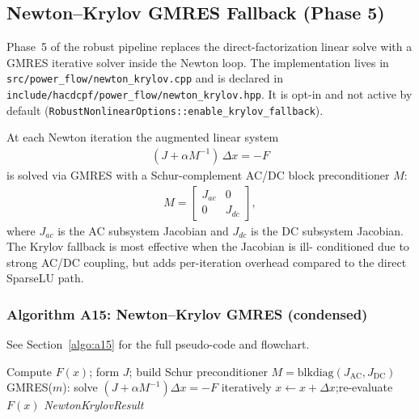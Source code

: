 \subsection{Newton--Krylov GMRES Fallback (Phase 5)}
\label{sec:newton-krylov}

Phase~5 of the robust pipeline replaces the direct-factorization linear solve
with a GMRES iterative solver inside the Newton loop.  The implementation lives
in \texttt{src/power\_flow/newton\_krylov.cpp} and is declared in
\texttt{include/hacdcpf/power\_flow/newton\_krylov.hpp}.  It is opt-in and not
active by default (\texttt{RobustNonlinearOptions::enable\_krylov\_fallback}).

At each Newton iteration the augmented linear system
\begin{align}
(J + \alpha M^{-1})\,\Delta x = -F
\end{align}
is solved via GMRES with a Schur-complement AC/DC block preconditioner $M$:
\begin{align}
M =
\begin{bmatrix}
J_{ac} & 0 \\
0 & J_{dc}
\end{bmatrix},
\end{align}
where $J_{ac}$ is the AC subsystem Jacobian and $J_{dc}$ is the DC subsystem
Jacobian.  The Krylov fallback is most effective when the Jacobian is ill-
conditioned due to strong AC/DC coupling, but adds per-iteration overhead
compared to the direct SparseLU path.

\subsubsection{Algorithm A15: Newton--Krylov GMRES (condensed)}
\label{algo:a15-inline}
See Section~\ref{algo:a15} for the full pseudo-code and flowchart.

\begin{algorithmic}[1]
  \State Compute $F(x)$; form $J$; build Schur preconditioner $M = \mathrm{blkdiag}(J_{\mathrm{AC}}, J_{\mathrm{DC}})$
    \State GMRES($m$): solve $(J + \alpha M^{-1})\Delta x = -F$ iteratively
    \State $x \gets x + \Delta x$;\quad re-evaluate $F(x)$
  \EndWhile
  \State \Return \textit{NewtonKrylovResult}
\EndProcedure
\end{algorithmic}

